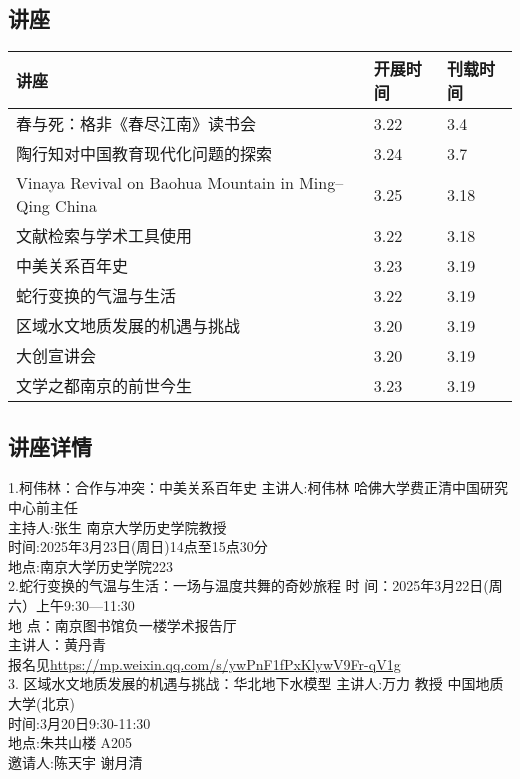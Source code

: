 \documentclass[letterpaper, 12pt]{article}
\begin{document}
\begin{multicols}{2}
\pagebreak

\section{讲座}
\begin{tabular}{|>{\centering\arraybackslash}m{}|m{}|m{}|}
    \hline
    讲座 & 开展时间 & 刊载时间\\
    \hline\hline
    春与死：格非《春尽江南》读书会 & 3.22 & 3.4\\\hline
    陶行知对中国教育现代化问题的探索 & 3.24 & 3.7\\\hline
    Vinaya Revival on Baohua Mountain in Ming–Qing China & 3.25 & 3.18 \\\hline
    文献检索与学术工具使用 & 3.22 & 3.18\\\hline
    中美关系百年史 & 3.23 & 3.19\\\hline
    蛇行变换的气温与生活 & 3.22 & 3.19\\\hline
    区域水文地质发展的机遇与挑战 & 3.20 & 3.19\\\hline
    大创宣讲会 & 3.20 & 3.19\\\hline
    文学之都南京的前世今生 & 3.23 & 3.19\\\hline
\end{tabular}
\subsection{讲座详情}
1.柯伟林：合作与冲突：中美关系百年史
主讲人:柯伟林 哈佛大学费正清中国研究中心前主任\\
主持人:张生 南京大学历史学院教授\\
时间:2025年3月23日(周日)14点至15点30分\\
地点:南京大学历史学院223\\

2.蛇行变换的气温与生活：一场与温度共舞的奇妙旅程
时  间：2025年3月22日(周六）上午9:30—11:30\\
地  点：南京图书馆负一楼学术报告厅\\
主讲人：黄丹青 \\
报名见\url{https://mp.weixin.qq.com/s/ywPnF1fPxKlywV9Fr-qV1g}\\

3. 区域水文地质发展的机遇与挑战：华北地下水模型
主讲人:万力 教授 中国地质大学(北京)\\
时间:3月20日9:30-11:30\\
地点:朱共山楼 A205\\
邀请人:陈天宇 谢月清\\


\end{multicols}
\end{document}

